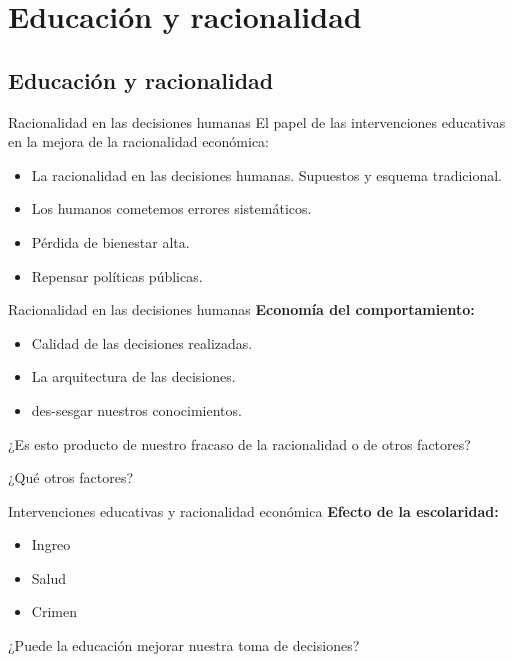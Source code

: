 \documentclass[11pt, aspectratio=169, compress]{beamer}
\begin{document}
\section{Educación y racionalidad}
\subsection{Educación y racionalidad}
\begin{frame}{Racionalidad en las decisiones humanas} 
El papel de las intervenciones educativas en la mejora de la racionalidad económica: 
\begin{itemize}
	\item La racionalidad en las decisiones humanas. Supuestos y esquema tradicional. 
	\item Los humanos cometemos errores sistemáticos. 
	\item Pérdida de bienestar alta. 
	\item Repensar políticas públicas. 
\end{itemize}
\end{frame}
\begin{frame}{Racionalidad en las decisiones humanas} 
\textbf{Economía del comportamiento: }
\begin{itemize}
	\item Calidad de las decisiones realizadas. 
	\item La arquitectura de las decisiones. 
	\item des-sesgar nuestros conocimientos. 
\end{itemize}
¿Es esto producto de nuestro fracaso de la racionalidad o de otros factores? 

¿Qué otros factores? 
\end{frame}
\begin{frame}{Intervenciones educativas y racionalidad económica}
	\textbf{Efecto de la escolaridad: }
	\begin{itemize}
		\item Ingreo 
		\item Salud
		\item Crimen
	\end{itemize}
	 ¿Puede la educación mejorar nuestra toma de decisiones? 
\end{frame}
\end{document}
